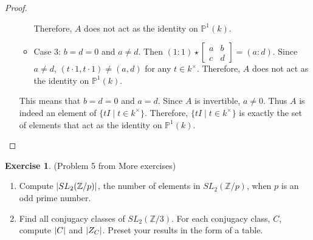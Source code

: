 \documentclass[12pt, psamsfonts]{amsart}
\theoremstyle{definition}
\newtheorem*{exer}{Exercise}
\theoremstyle{remark}
\numberwithin{equation}{section}
\begin{document}
\begin{proof}
\begin{enumerate}
\begin{itemize}
          Therefore, $A$ does not act as the identity on $\mathbb{P}^1(k)$.
        \item
          Case 3: $b = d = 0$ and $a \ne d$.
          Then $(1 : 1) \star \begin{bmatrix} a & b \\ c & d \end{bmatrix} = (a : d)$.
          Since $a \ne d$, $(t \cdot 1, t \cdot 1) \ne (a, d)$ for any $t \in k^{\times}$.
          Therefore, $A$ does not act as the identity on $\mathbb{P}^1(k)$.
      \end{itemize}
      This means that $b = d = 0$ and $a = d$.
      Since $A$ is invertible, $a \ne 0$.
      Thus $A$ is indeed an element of $\{ tI \mid t \in k^{\times} \}$.
      Therefore, $\{ tI \mid t \in k^{\times} \}$ is exactly the set of elements that act as the identity on $\mathbb{P}^1(k)$.
  \end{enumerate}
\end{proof}

\begin{exer}{(Problem 5 from More exercises)}
  $ $
  \begin{enumerate}
    \item
      Compute $\abs{SL_2(\mathbb{Z}/p)}$, the number of elements in $SL_2(\mathbb{Z}/p)$, when $p$ is an odd prime number.
    \item
      Find all conjugacy classes of $SL_2(\mathbb{Z}/3)$.
      For each conjugacy class, $C$, compute $\abs{C}$ and $\abs{Z_C}$.
      Preset your results in the form of a table.
  \end{enumerate}
\end{exer}
\end{document}
